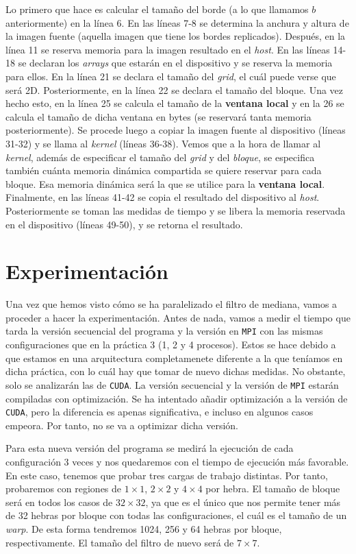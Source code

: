 \documentclass[11pt,a4paper]{article}
\begin{document}
Lo primero que hace es calcular el tamaño del borde (a lo que llamamos $b$ anteriormente)
en la línea 6. En las líneas 7-8 se determina la anchura y altura de la imagen fuente (aquella
imagen que tiene los bordes replicados). Después, en la línea 11 se reserva memoria para la
imagen resultado en el \textit{host}. En las líneas 14-18 se declaran los \textit{arrays} que
estarán en el dispositivo y se reserva la memoria para ellos. En la línea 21 se declara
el tamaño del \textit{grid}, el cuál puede verse que será 2D. Posteriormente, en la línea
22 se declara el tamaño del bloque. Una vez hecho esto, en la línea 25 se calcula el tamaño
de la \textbf{ventana local} y en la 26 se calcula el tamaño de dicha ventana en bytes (se
reservará tanta memoria posteriormente). Se procede luego a copiar la imagen fuente al
dispositivo (líneas 31-32) y se llama al \textit{kernel} (líneas 36-38). Vemos que a la hora
de llamar al \textit{kernel}, además de especificar el tamaño del \textit{grid} y del 
\textit{bloque}, se especifica también cuánta memoria dinámica compartida se quiere reservar
para cada bloque. Esa memoria dinámica será la que se utilice para la \textbf{ventana local}.
Finalmente, en las líneas 41-42 se copia el resultado del dispositivo al \textit{host}.
Posteriormente se toman las medidas de tiempo y se libera la memoria reservada en el
dispositivo (líneas 49-50), y se retorna el resultado.


\section{Experimentación}

Una vez que hemos visto cómo se ha paralelizado el filtro de mediana, vamos a proceder a
hacer la experimentación. Antes de nada, vamos a medir el tiempo que tarda la versión secuencial
del programa y la versión en \texttt{MPI} con las mismas configuraciones que en la práctica 3
(1, 2 y 4 procesos). Estos se hace debido a que estamos en una arquitectura completamenete
diferente a la que teníamos en dicha práctica, con lo cuál hay que tomar de nuevo dichas
medidas. No obstante, solo se analizarán las de \texttt{CUDA}. La versión secuencial y la
versión de \texttt{MPI} estarán compiladas con optimización. Se ha intentado añadir optimización
a la versión de \texttt{CUDA}, pero la diferencia es apenas significativa, e incluso en algunos
casos empeora. Por tanto, no se va a optimizar dicha versión.

Para esta nueva versión del programa se medirá la ejecución de cada configuración 3 veces y
nos quedaremos con el tiempo de ejecución más favorable. En este caso, tenemos que probar tres
cargas de trabajo distintas. Por tanto, probaremos con regiones de $1 \times 1$, $2 \times 2$ y
$4 \times 4$ por hebra. El tamaño de bloque será en todos los casos de $32 \times 32$, ya que es
el único que nos permite tener más de 32 hebras por bloque con todas las configuraciones, el cuál
es el tamaño de un \textit{warp}. De esta forma tendremos 1024, 256 y 64 hebras por bloque,
respectivamente. El tamaño del filtro de nuevo será de $7 \times 7$.
\end{document}
